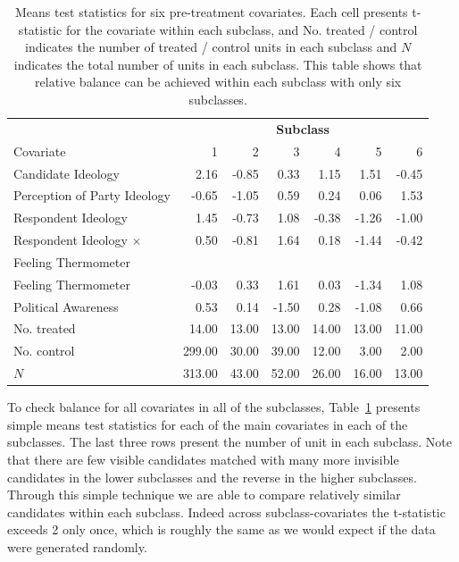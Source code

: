 \documentclass[11pt,letterpaper]{article}
\theoremstyle{plain}
\newcommand{\MC}{\multicolumn}
\begin{document}
\begin{table}[t]
  \begin{center}
    \begin{tabular}{lrrrrrr}
      \hline
      & \MC{6}{c}{\bf Subclass} \\
      Covariate &  1 &  2 &  3 &  4 &  5 &  6 \\
      \hline
      Candidate Ideology & 2.16 & -0.85 & 0.33 & 1.15 & 1.51 & -0.45 \\
      Perception of Party Ideology & -0.65 & -1.05 & 0.59 & 0.24 & 0.06 & 1.53 \\
      Respondent Ideology & 1.45 & -0.73 & 1.08 & -0.38 & -1.26 & -1.00 \\
      Respondent Ideology $\times$ & 0.50 & -0.81 & 1.64 & 0.18 &
      -1.44 & -0.42 \\
      \hspace{0.1in} Feeling Thermometer \\
      Feeling Thermometer & -0.03 & 0.33 & 1.61 & 0.03 & -1.34 & 1.08 \\
      Political Awareness & 0.53 & 0.14 & -1.50 & 0.28 & -1.08 & 0.66 \\
      No. treated & 14.00 & 13.00 & 13.00 & 14.00 & 13.00 & 11.00 \\
      No. control & 299.00 & 30.00 & 39.00 & 12.00 & 3.00 & 2.00 \\
      $N$ & 313.00 & 43.00 & 52.00 & 26.00 & 16.00 & 13.00 \\
      \hline
    \end{tabular}
    \caption{Means test statistics for six pre-treatment covariates.
      Each cell presents t-statistic for the covariate within each
      subclass, and No. treated / control indicates the number of
      treated / control units in each subclass and $N$ indicates the total
      number of units in each subclass.  This table shows that
      relative balance can be achieved within each subclass with only
      six subclasses.}
    \label{tb:kochxsub}
  \end{center}
\end{table}

To check balance for all covariates in all of the subclasses,
Table~\ref{tb:kochxsub} presents simple means test statistics for each
of the main covariates in each of the subclasses.  The last three rows
present the number of unit in each subclass.  Note that there are few
visible candidates matched with many more invisible candidates in the
lower subclasses and the reverse in the higher subclasses.  Through
this simple technique we are able to compare relatively similar
candidates within each subclass.  Indeed across subclass-covariates
the t-statistic exceeds 2 only once, which is roughly the same as we
would expect if the data were generated randomly.
\end{document}
